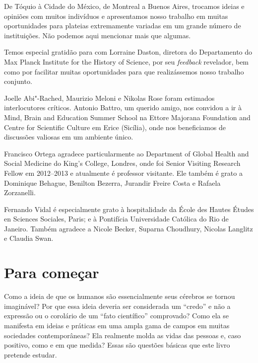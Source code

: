 De Tóquio à Cidade do México, de Montreal a Buenos Aires, trocamos
ideias e opiniões com muitos indivíduos e apresentamos nosso trabalho em
muitas oportunidades para plateias extremamente variadas em um grande
número de instituições. Não podemos aqui mencionar mais que algumas.

Temos especial gratidão para com Lorraine Daston, diretora do
Departamento  do Max Planck Institute for the History of Science, por
seu \emph{feedback} revelador, bem como por facilitar muitas
oportunidades para que realizássemos nosso trabalho conjunto.

Joelle Abi"-Rached, Maurizio Meloni e Nikolas Rose foram estimados
interlocutores críticos. Antonio Battro, um querido amigo, nos convidou
a ir à Mind, Brain and Education Summer School na Ettore Majorana
Foundation and Centre for Scientific Culture em Erice (Sicília), onde
nos beneficiamos de discussões valiosas em um ambiente único.

Francisco Ortega agradece particularmente ao Department of Global Health
and Social Medicine do King's College, Londres, onde foi Senior
Visiting Research Fellow em 2012--2013 e atualmente é professor
visitante. Ele também é grato a Dominique Behague, Benilton Bezerra,
Jurandir Freire Costa e Rafaela Zorzanelli.

Fernando Vidal é especialmente grato à hospitalidade da École des Hautes
Études en Sciences Sociales, Paris; e à Pontifícia Universidade Católica
do Rio de Janeiro. Também agradece a Nicole Becker, Suparna Choudhury,
Nicolas Langlitz e Claudia Swan.

\chapter*{Para começar}

Como a ideia de que os humanos são essencialmente seus cérebros se
tornou imaginável? Por que essa ideia deveria ser considerada um
``credo'' e não a expressão ou o corolário de um ``fato científico''
comprovado? Como ela se manifesta em ideias e práticas em uma ampla gama de
campos em muitas sociedades contemporâneas? Ela realmente molda as vidas das
pessoas e, caso positivo, como e em que medida? Essas são questões
básicas que este livro pretende estudar.


